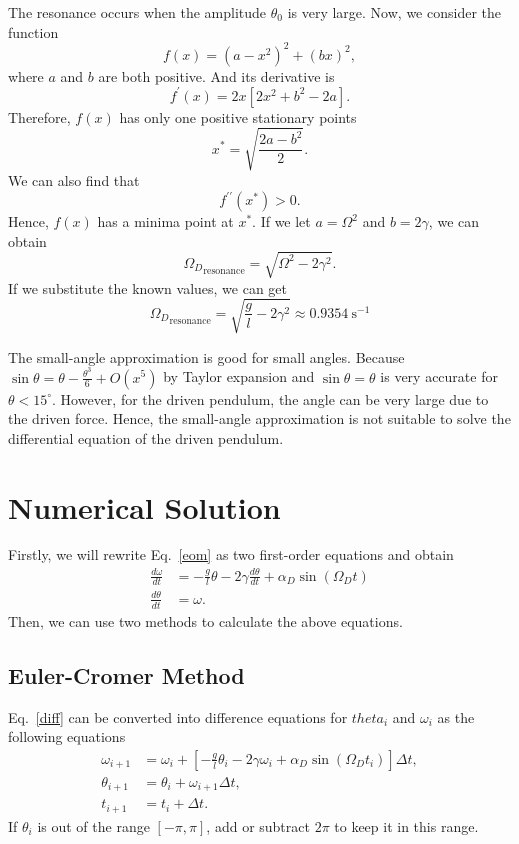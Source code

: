 \documentclass[a4paper]{article}
\begin{document}
	
	The resonance occurs when the amplitude ${\theta}_0$ is very large. Now, we consider the function
	\begin{equation}
		f(x) = (a - x^2)^2 + (bx)^2,
	\end{equation}
	where $a$ and $b$ are both positive. And its derivative is
	\begin{equation}
		f^\prime(x) = 2x [2x^2 + b^2 - 2a].
	\end{equation}
	Therefore, $f(x)$ has only one positive stationary points
	\begin{equation} 
		x^{*} = \sqrt{\frac{2a - b^2}{2}}.
	\end{equation} 
	We can also find that
	\begin{equation}
		f^{\prime\prime}(x^*) > 0.
	\end{equation}
	Hence, $f(x)$ has a minima point at $x^*$. If we let $a = {\Omega}^2$ and $b = 2\gamma$, we can obtain
	\begin{equation}
		{{\Omega}_{D}}_\mathrm{resonance} = \sqrt{{\Omega}^2 - 2{\gamma}^2}.
	\end{equation}
	If we substitute the known values, we can get
	\begin{equation} \label{as}
		{{\Omega}_{D}}_\mathrm{resonance} = \sqrt{\frac{g}{l} - 2{\gamma}^2} \approx 0.9354 \mathrm{~s^{-1}} 
	\end{equation}
	
	The small-angle approximation is good for small angles. Because $\sin\theta = \theta - \frac{{\theta}^3}{6} + O(x^5)$ by Taylor expansion and $\sin\theta = \theta$ is very accurate for $\theta < 15^{\circ}$. However, for the driven pendulum, the angle can be very large due to the driven force. Hence, the small-angle approximation is not suitable to solve the differential equation of the driven pendulum.

	\section{Numerical Solution}
	Firstly, we will rewrite Eq.~\eqref{eom} as two first-order equations and obtain
	\begin{align} \label{diff} 
		\frac{d\omega}{dt} &= -\frac{g}{l}\theta - 2\gamma\frac{d\theta}{dt} + \alpha _D\sin(\Omega _D t) \\
		\frac{d\theta}{dt} &= \omega. \nonumber
	\end{align}
	Then, we can use two methods to calculate the above equations.
	\subsection{Euler-Cromer Method}
	Eq.~\eqref{diff} can be converted into difference equations for $theta _i$ and $\omega _i$ as the following equations
	\begin{align}
		\omega _{i+1} &= \omega _i + [-\frac{g}{l}\theta _i - 2\gamma \omega _i  + \alpha _D \sin(\Omega _D t_i)]\Delta t, \\
		\theta _{i+1} &= \theta _i + \omega _{i+1}\Delta t, \nonumber \\
		t_{i+1} &= t_i + \Delta t. \nonumber
	\end{align}
	If $\theta _i$ is out of the range $[-\pi, \pi]$, add or subtract $2\pi$ to keep it in this range.
\end{document}
